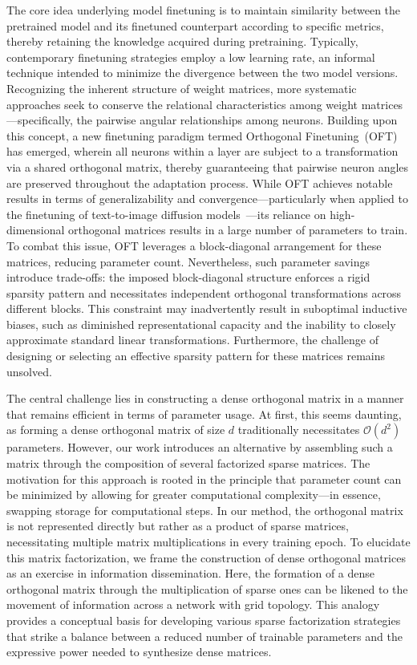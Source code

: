 The core idea underlying model finetuning is to maintain similarity between the pretrained model and its finetuned counterpart according to specific metrics, thereby retaining the knowledge acquired during pretraining. Typically, contemporary finetuning strategies employ a low learning rate, an informal technique intended to minimize the divergence between the two model versions. Recognizing the inherent structure of weight matrices, more systematic approaches seek to conserve the relational characteristics among weight matrices—specifically, the pairwise angular relationships among neurons. Building upon this concept, a new finetuning paradigm termed Orthogonal Finetuning~(OFT)~\cite{qiu2023controlling} has emerged, wherein all neurons within a layer are subject to a transformation via a shared orthogonal matrix, thereby guaranteeing that pairwise neuron angles are preserved throughout the adaptation process. While OFT achieves notable results in terms of generalizability and convergence—particularly when applied to the finetuning of text-to-image diffusion models~\cite{qiu2023controlling}—its reliance on high-dimensional orthogonal matrices results in a large number of parameters to train. To combat this issue, OFT leverages a block-diagonal arrangement for these matrices, reducing parameter count. Nevertheless, such parameter savings introduce trade-offs: the imposed block-diagonal structure enforces a rigid sparsity pattern and necessitates independent orthogonal transformations across different blocks. This constraint may inadvertently result in suboptimal inductive biases, such as diminished representational capacity and the inability to closely approximate standard linear transformations. Furthermore, the challenge of designing or selecting an effective sparsity pattern for these matrices remains unsolved.

The central challenge lies in constructing a dense orthogonal matrix in a manner that remains efficient in terms of parameter usage. At first, this seems daunting, as forming a dense orthogonal matrix of size $d$ traditionally necessitates $\mathcal{O}(d^2)$ parameters. However, our work introduces an alternative by assembling such a matrix through the composition of several factorized sparse matrices. The motivation for this approach is rooted in the principle that parameter count can be minimized by allowing for greater computational complexity—in essence, swapping storage for computational steps. In our method, the orthogonal matrix is not represented directly but rather as a product of sparse matrices, necessitating multiple matrix multiplications in every training epoch. To elucidate this matrix factorization, we frame the construction of dense orthogonal matrices as an exercise in information dissemination. Here, the formation of a dense orthogonal matrix through the multiplication of sparse ones can be likened to the movement of information across a network with grid topology. This analogy provides a conceptual basis for developing various sparse factorization strategies that strike a balance between a reduced number of trainable parameters and the expressive power needed to synthesize dense matrices.

